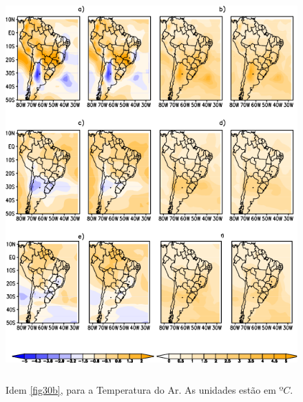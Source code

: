 \begin{figure}[!h]
\centering
\includegraphics[height=15cm]{./figs/campo_vies_eqm-temp.png}
\caption{Idem \autoref{fig30b}, para a Temperatura do Ar. As unidades estão em $ºC$.}
\label{fig31b}
\end{figure}

\break

